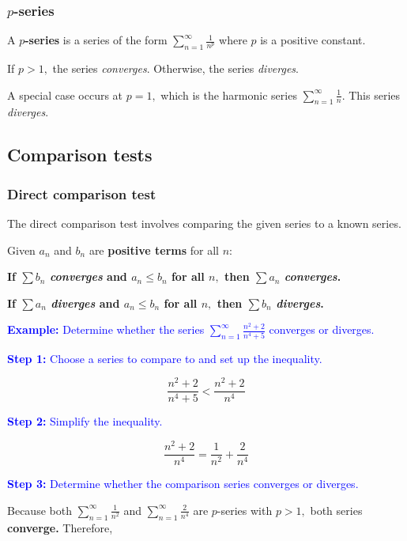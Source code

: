 \documentclass[letterpaper, 12pt]{article}
\newcommand{\example}[1]{\textcolor{blue}{\textbf{Example:} #1}}
\newcommand{\step}[2]{\textcolor{blue}{\textbf{Step #1:} #2}}
\begin{document}
\subsubsection*{$p$-series}

A \textbf{$p$-series} is a series of the form $\displaystyle \sum_{n=1}^\infty \frac{1}{n^p}$ where $p$ is a positive constant.

If $p > 1,$ the series \textit{converges}. Otherwise, the series \textit{diverges}.

A special case occurs at $p = 1,$ which is the harmonic series $\displaystyle \sum_{n=1}^\infty \frac{1}{n}$. This series \textit{diverges}.

\subsection*{Comparison tests}

\subsubsection*{Direct comparison test}

The direct comparison test involves comparing the given series to a known series.

Given $a_n$ and $b_n$ are \textbf{positive terms} for all $n$:

\textbf{If $\displaystyle \sum b_n$ \textit{converges} and $a_n \leq b_n$ for all $n,$ then $\displaystyle \sum a_n$ \textit{converges}.}

\textbf{If $\displaystyle \sum a_n$ \textit{diverges} and $a_n \leq b_n$ for all $n,$ then $\displaystyle \sum b_n$ \textit{diverges}.}

\example{Determine whether the series $\displaystyle \sum_{n=1}^\infty \frac{n^2+2}{n^4+5}$ converges or diverges.}

\step{1}{Choose a series to compare to and set up the inequality.}

$$\frac{n^2+2}{n^4+5} < \frac{n^2+2}{n^4}$$

\step{2}{Simplify the inequality.}

$$\frac{n^2+2}{n^4} = \frac{1}{n^2} + \frac{2}{n^4}$$

\step{3}{Determine whether the comparison series converges or diverges.}

Because both $\displaystyle \sum_{n=1}^\infty \frac{1}{n^2}$ and $\displaystyle \sum_{n=1}^\infty \frac{2}{n^4}$ are $p$-series with $p > 1,$ both series \textbf{converge.} Therefore, 
\end{document}
